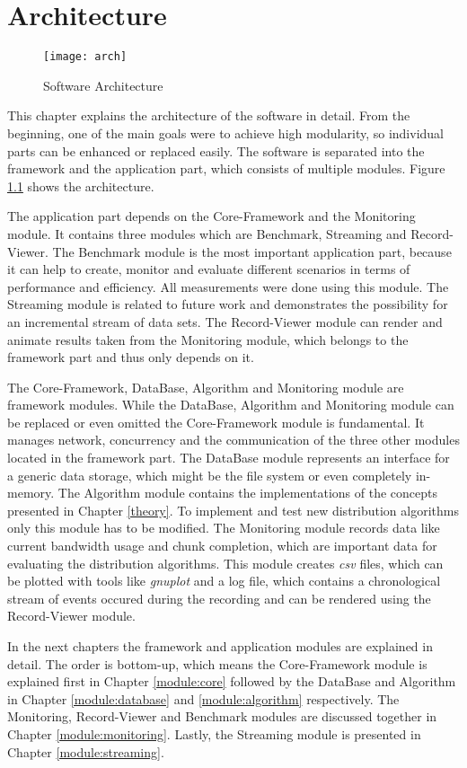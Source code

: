 
\chapter{Architecture}
\label{architecture}

\begin{figure}[ht]
	\centering
	\texttt{[image: arch]}
	\caption{Software Architecture}
	\label{fig:arch}
\end{figure}

This chapter explains the architecture of the software in detail. From the beginning, one of the main goals were to achieve high modularity, so individual parts can be enhanced or replaced easily. The software is separated into the framework and the application part, which consists of multiple modules. Figure \ref{fig:arch} shows the architecture. 

The application part depends on the Core-Framework and the Monitoring module. It contains three modules which are Benchmark, Streaming and Record-Viewer. The Benchmark module is the most important application part, because it can help to create, monitor and evaluate different scenarios in terms of performance and efficiency. All measurements were done using this module. The Streaming module is related to future work and demonstrates the possibility for an incremental stream of data sets. The Record-Viewer module can render and animate results taken from the Monitoring module, which belongs to the framework part and thus only depends on it.

The Core-Framework, DataBase, Algorithm and Monitoring module are framework modules. While the DataBase, Algorithm and Monitoring module can be replaced or even omitted the Core-Framework module is fundamental. It manages network, concurrency and the communication of the three other modules located in the framework part. The DataBase module represents an interface for a generic data storage, which might be the file system or even completely in-memory. The Algorithm module contains the implementations of the concepts presented in Chapter \ref{theory}. To implement and test new distribution algorithms only this module has to be modified. The Monitoring module records data like current bandwidth usage and chunk completion, which are important data for evaluating the distribution algorithms. This module creates \emph{csv} files, which can be plotted with tools like \emph{gnuplot} and a log file, which contains a chronological stream of events occured during the recording and can be rendered using the Record-Viewer module.

In the next chapters the framework and application modules are explained in detail. The order is bottom-up, which means the Core-Framework module is explained first in Chapter \ref{module:core} followed by the DataBase and Algorithm in Chapter \ref{module:database} and \ref{module:algorithm} respectively. The Monitoring, Record-Viewer and Benchmark modules are discussed together in Chapter \ref{module:monitoring}. Lastly, the Streaming module is presented in Chapter \ref{module:streaming}.